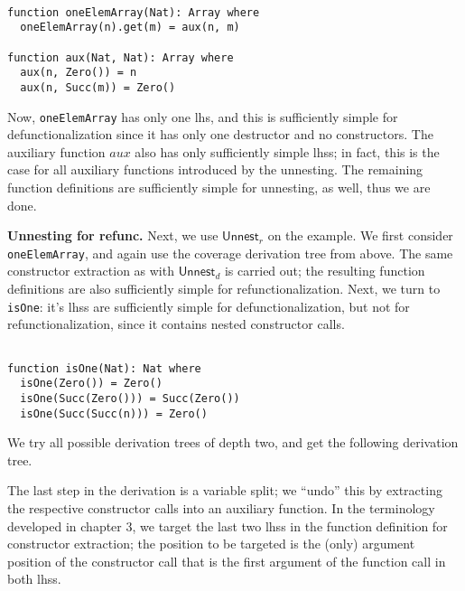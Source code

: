 \begin{lstlisting}

function oneElemArray(Nat): Array where
  oneElemArray(n).get(m) = aux(n, m)

function aux(Nat, Nat): Array where
  aux(n, Zero()) = n
  aux(n, Succ(m)) = Zero()

\end{lstlisting}

Now, \texttt{oneElemArray} has only one lhs, and this is sufficiently simple for defunctionalization since it has only one destructor and no constructors. The auxiliary function $aux$ also has only sufficiently simple lhss; in fact, this is the case for all auxiliary functions introduced by the unnesting. The remaining function definitions are sufficiently simple for unnesting, as well, thus we are done.

\textbf{Unnesting for refunc.} Next, we use $\textsf{Unnest}_r$ on the example. We first consider \texttt{oneElemArray}, and again use the coverage derivation tree from above. The same constructor extraction as with $\textsf{Unnest}_d$ is carried out; the resulting function definitions are also sufficiently simple for refunctionalization. Next, we turn to \texttt{isOne}: it's lhss are sufficiently simple for defunctionalization, but not for refunctionalization, since it contains nested constructor calls.

\begin{lstlisting}

function isOne(Nat): Nat where
  isOne(Zero()) = Zero()
  isOne(Succ(Zero())) = Succ(Zero())
  isOne(Succ(Succ(n))) = Zero()

\end{lstlisting}

We try all possible derivation trees of depth two, and get the following derivation tree.

\begin{prooftree}
\end{prooftree}

The last step in the derivation is a variable split; we ``undo'' this by extracting the respective constructor calls into an auxiliary function. In the terminology developed in chapter 3, we target the last two lhss in the function definition for constructor extraction; the position to be targeted is the (only) argument position of the constructor call that is the first argument of the function call in both lhss.

